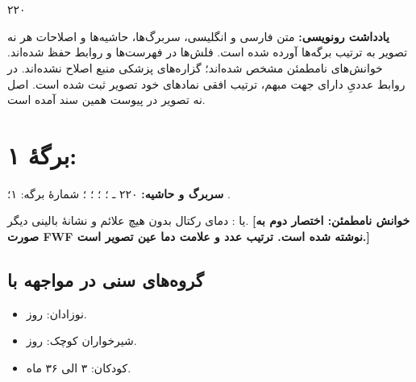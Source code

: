 \documentclass[12pt,a4paper]{article}
\begin{document}
\fi
\providecommand{\FWLSunclear}[1]{\textbf{[خوانش نامطمئن: #1]}}
\providecommand{\FWLSmath}[1]{\lr{\(#1\)}}
\providecommand{\FWLSpage}[2]{\clearpage\section*{برگهٔ #1: \lr{\texttt{pic#2.jpg}}}}
\providecommand{\FWLSheader}[1]{\textbf{سربرگ و حاشیه:} ۲۲۰ ـ \lr{FWLS}؛
  \lr{Subject:} (خالی)؛ \lr{Date: / /}؛ شمارهٔ برگه: #1؛ نشان پایین برگه: \lr{YASHA}.\par}

\begin{center}
  {\Large\bfseries{}}\\
  \\
  ۲۲۰
\end{center}
\textbf{یادداشت رونویسی:} متن فارسی و انگلیسی، سربرگ‌ها، حاشیه‌ها و اصلاحات هر نه تصویر به ترتیب برگه‌ها آورده شده است. فلش‌ها در فهرست‌ها و روابط حفظ شده‌اند. خوانش‌های نامطمئن مشخص شده‌اند؛ گزاره‌های پزشکی منبع اصلاح نشده‌اند. در روابط عددیِ دارای جهت مبهم، ترتیب افقی نمادهای خود تصویر ثبت شده است. اصل نه تصویر در پیوست همین سند آمده است.

\FWLSpage{۱}{01}
\textbf{سربرگ و حاشیه:} ۲۲۰ ـ ؛ ؛
؛ ؛ شمارهٔ برگه: ۱؛ .

 یا : دمای رکتال \FWLSmath{38^\circ\leq} بدون هیچ علائم و نشانهٔ بالینی دیگر.
\FWLSunclear{اختصار دوم به صورت FWF نوشته شده است. ترتیب عدد و علامت دما عین تصویر است.}

\subsection*{گروه‌های سنی در مواجهه با }
\begin{itemize}
\item نوزادان:  روز.
\item شیرخواران کوچک:  روز.
\item کودکان: ۳ الی ۳۶ ماه.
\end{itemize}
\end{document}
